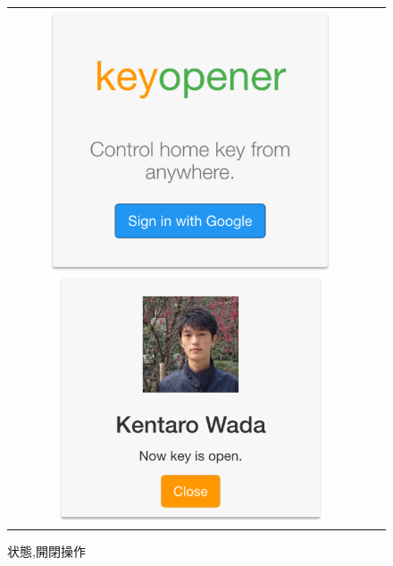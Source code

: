 \begin{figure}[htbp]
  \begin{tabular}{cc}
    \begin{minipage}{0.5\hsize}
      \begin{center}
        \includegraphics[width=0.8\textwidth]{./assets/login_page.eps}
        \caption{ログイン}
        \label{fig:login_page}
      \end{center}
    \end{minipage}
    \begin{minipage}{0.5\hsize}
      \begin{center}
        \includegraphics[width=0.75\textwidth]{./assets/control_page.eps}
        \caption{状態,開閉操作}
        \label{fig:control_page}
      \end{center}
    \end{minipage}
  \end{tabular}
\end{figure}

